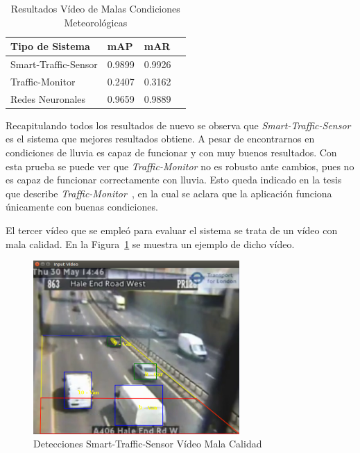 \begin{table}[H] 
\begin{center}
\begin{tabular}{|l|l|l|l|}
\hline
Tipo de Sistema & mAP & mAR  \\ 
\hline \hline
Smart-Traffic-Sensor & 0.9899 & 0.9926 \\ \hline
Traffic-Monitor & 0.2407 & 0.3162 \\ \hline
Redes Neuronales & 0.9659 & 0.9889\\ \hline
\end{tabular}
\caption{Resultados Vídeo de Malas Condiciones Meteorológicas}
\label{resultados_video_malas_condiciones}
\end{center}
\end{table}

Recapitulando todos los resultados de nuevo se observa que \textit{Smart-Traffic-Sensor} es el sistema que mejores resultados obtiene. A pesar de encontrarnos en condiciones de lluvia es capaz de funcionar y con muy buenos resultados. Con esta prueba se puede ver que \textit{Traffic-Monitor} no es robusto ante cambios, pues no es capaz de funcionar correctamente con lluvia. Esto queda indicado en la tesis que describe \textit{Traffic-Monitor}~\cite{redo_tesis}, en la cual se aclara que la aplicación funciona únicamente con buenas condiciones.

El tercer vídeo que se empleó para evaluar el sistema se trata de un vídeo con mala calidad. En la Figura~\ref{fig.video_mala_calidad} se muestra un ejemplo de dicho vídeo.


\begin{figure}[H] 
\begin{center}
	\includegraphics[width=0.7\textwidth]{figures/Experimentos/sts_mala_calidad.png}
   \caption{Detecciones Smart-Traffic-Sensor Vídeo Mala Calidad}
	\label{fig.video_mala_calidad}
\end{center}
\end{figure}

